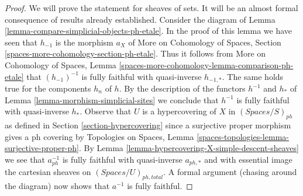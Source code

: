 \documentclass{stacks-project}
\theoremstyle{plain}
\theoremstyle{definition}
\theoremstyle{remark}
\numberwithin{equation}{subsection}
\begin{document}
\begin{proof}
We will prove the statement for sheaves of sets. It will be an
almost formal consequence of results already established.
Consider the diagram of
Lemma \ref{lemma-compare-simplicial-objects-ph-etale}.
In the proof of this lemma we have seen that
$h_{-1}$ is the morphism $a_X$ of
More on Cohomology of Spaces, Section
\ref{spaces-more-cohomology-section-ph-etale}.
Thus it follows from
More on Cohomology of Spaces, Lemma
\ref{spaces-more-cohomology-lemma-comparison-ph-etale}
that $(h_{-1})^{-1}$ is fully faithful with quasi-inverse $h_{-1, *}$.
The same holds true for the components $h_n$ of $h$.
By the description of the functors $h^{-1}$ and $h_*$ of
Lemma \ref{lemma-morphism-simplicial-sites}
we conclude that $h^{-1}$ is fully faithful with quasi-inverse $h_*$.
Observe that $U$ is a hypercovering of $X$ in $(\textit{Spaces}/S)_{ph}$
as defined in Section \ref{section-hypercovering} since a surjective
proper morphism gives a ph covering by Topologies on Spaces, Lemma
\ref{spaces-topologies-lemma-surjective-proper-ph}.
By Lemma \ref{lemma-hypercovering-X-simple-descent-sheaves}
we see that $a_{ph}^{-1}$ is fully faithful with quasi-inverse
$a_{ph, *}$ and with essential image the cartesian sheaves
on $(\textit{Spaces}/U)_{ph, total}$.
A formal argument (chasing around the diagram) now shows that
$a^{-1}$ is fully faithful.


\end{proof}
\end{document}

